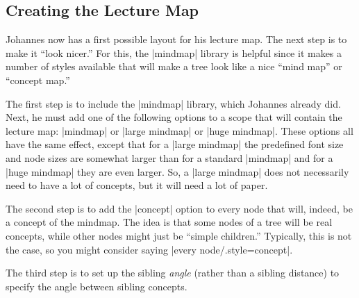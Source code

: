 \subsection{Creating the Lecture Map}

Johannes now has a first possible layout for his lecture map. The next
step is to make it ``look nicer.'' For this, the |mindmap| library is
helpful since it makes a number of styles available that will make a
tree look like a nice ``mind map'' or ``concept map.''

The first step is to include the |mindmap| library, which Johannes
already did. Next, he must add one of the following options to a scope
that will contain the lecture map: |mindmap| or |large mindmap| or
|huge mindmap|. These options all have the same effect, except that
for a |large mindmap| the predefined font size and node sizes are
somewhat larger than for a standard |mindmap| and for a |huge mindmap|
they are even larger. So, a |large mindmap| does not necessarily need
to have a lot of concepts, but it will need a lot of paper.

The second step is to add the |concept| option to every node that
will, indeed, be a concept of the mindmap. The idea is that some nodes
of a tree will be real concepts, while other nodes might just be
``simple children.'' Typically, this is not the case, so you might
consider saying |every node/.style=concept|.

The third step is to set up the sibling \emph{angle} (rather than a
sibling distance) to specify the angle between sibling concepts.


